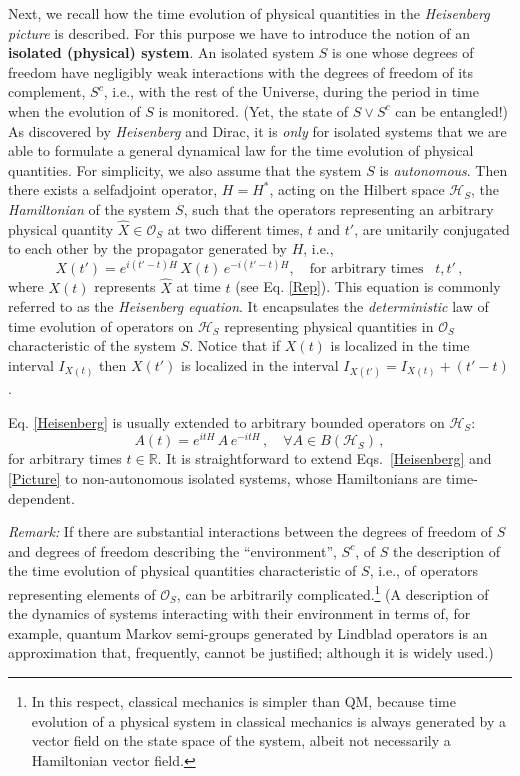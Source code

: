 \documentclass[a4paper,11pt]{article}
\begin{document}
Next, we recall how the time evolution of physical quantities in the \textit{Heisenberg picture} is described.
For this purpose we have to introduce the notion of an {\bf{isolated (physical) system}}.
An isolated system $S$ is one whose degrees of freedom have negligibly weak interactions with the 
degrees of freedom of its complement, $S^{c}$, i.e., with the rest of the Universe, during the period in 
time when the evolution of $S$ is monitored. (Yet, the state of $S\vee S^{c}$ can be entangled!) 
As discovered by \textit{Heisenberg} and Dirac, it is \textit{only} for isolated systems that we are 
able to formulate a general dynamical law for the time evolution of physical quantities. For simplicity, we also assume that the 
system $S$ is \textit{autonomous}. Then there exists a selfadjoint operator, $H=H^{*}$, 
acting on the Hilbert space $\mathcal{H}_S$, the \textit{Hamiltonian} of the system $S$, such that the operators representing an arbitrary physical quantity $\hat{X}\in \mathcal{O}_S$ at two different times, $t$ and $t'$, are unitarily conjugated to each other by the propagator generated by $H$, i.e.,
\begin{equation}\label{Heisenberg}
X(t') = e^{i(t'-t)H} \,X(t) \,e^{-i(t'-t)H}, \quad \text{for arbitrary times }\,\,\, t, t'\,,
\end{equation}
where $X(t)$ represents $\hat{X}$ at time $t$ (see Eq. \eqref{Rep}). This equation is 
commonly referred to as the \textit{Heisenberg equation}. It encapsulates the \textit{deterministic} law of time evolution of 
operators on $\mathcal{H}_S$ representing physical quantities in $\mathcal{O}_S$ characteristic of the system $S$. 
Notice that if $X(t)$ is localized in the time interval $I_{X(t)}$ then $X(t')$ is localized in the interval $I_{X(t')}= I_{X(t)} +(t'-t)$.

Eq. \eqref{Heisenberg} is usually extended to arbitrary bounded operators on $\mathcal{H}_S$:
\begin{equation}\label{Picture}
A(t) = e^{itH} \, A \, e^{-itH}\,, \quad \forall A \in B(\mathcal{H}_S)\,,
\end{equation}
for arbitrary times $t \in \mathbb{R}$. It is straightforward to extend Eqs.~\eqref{Heisenberg} and \eqref{Picture} to 
non-autonomous isolated systems, whose Hamiltonians are time-dependent.

\textit{Remark:} If there are substantial interactions between the degrees of freedom 
of $S$ and degrees of freedom describing the ``environment'', $S^{c}$, of $S$ the description of the time evolution 
of physical quantities characteristic of $S$, i.e., of operators representing elements of $\mathcal{O}_S$, can be 
arbitrarily complicated.\footnote{In this respect, classical mechanics is simpler than QM, because time evolution 
of a physical system in classical mechanics is always generated by a vector field on the state space of the system, 
albeit not necessarily a Hamiltonian vector field.}
(A description of the dynamics of systems interacting with their environment in terms of, for example, 
quantum Markov semi-groups generated by Lindblad operators is an approximation that, frequently, 
cannot be justified; although it is widely used.)\\
\end{document}
